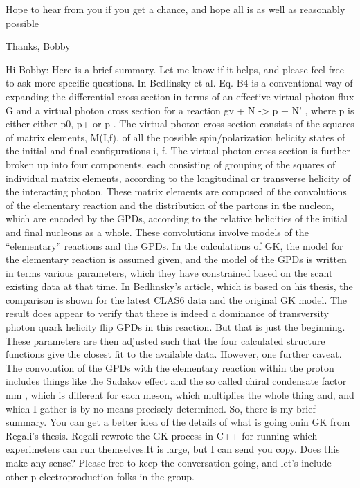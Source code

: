     Hope to hear from you if you get a chance, and hope all is as well as reasonably possible
    
    Thanks,
    Bobby
    
    
    Hi Bobby: 
	Here is a brief summary. Let me know if it helps, and please feel free to ask more specific questions.
	In Bedlinsky et al. Eq. B4 is a conventional way of expanding the differential cross section in terms of an effective virtual  photon flux G and a virtual photon cross section for a reaction  gv  + N -> p + N’ , where p is either either p0, p+ or p-.
	The virtual photon cross section consists of the squares of  matrix elements, M(I,f),  of all the possible spin/polarization helicity states of the initial and final configurations i, f.
	The virtual photon cross section is further  broken up into four components, each consisting of grouping of the squares of individual matrix elements,  according to the longitudinal or transverse helicity of the interacting photon.  	 
	These matrix elements are composed of the convolutions of the elementary reaction and the distribution of the partons in the nucleon, which are encoded by the GPDs, according to the relative helicities of the initial and final nucleons as a whole.
    These convolutions involve models of the “elementary” reactions and the GPDs. 
    	In the calculations of GK, the model for the elementary reaction is assumed given, and  the model of the GPDs is written in terms various parameters, which they have constrained based on the scant existing data at that time.
    	In Bedlinsky’s article, which is based on his thesis,  the comparison is shown for the latest CLAS6 data and the original GK model. The result does appear to verify  that there is indeed a dominance of transversity photon quark helicity flip GPDs in this reaction. 
    	But that is just the beginning. These parameters are then adjusted such that the four calculated  structure functions give the closest fit to the available data. 
    	However, one further caveat. The convolution of the GPDs with the elementary reaction within the proton includes things like the Sudakov effect and the so called chiral condensate factor  mm    , which is different for each meson, which multiplies the whole thing and, and which I gather  is by no means precisely determined.
    	So, there is my brief summary. You can get a better idea of the details of what is going onin GK  from Regali’s thesis. Regali rewrote the GK process in C++ for running which experimeters can run themselves.It is large, but  I can send you copy.
    	Does this make any sense? Please free to keep the conversation going, and let’s include other p electroproduction folks in the group.
    
